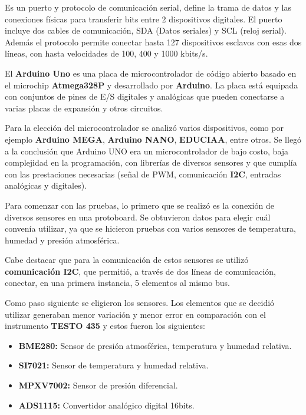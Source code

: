 \begin{tcolorbox}[colback=blue!5!white,colframe=blue!75!black,title=I2C]
	Es un puerto y protocolo de comunicación serial, define la trama de datos y las conexiones físicas para transferir bits entre 2 dispositivos digitales. El puerto incluye dos cables de comunicación, SDA (Datos seriales) y SCL (reloj serial). Además el protocolo permite conectar hasta 127 dispositivos esclavos con esas dos líneas, con hasta velocidades de 100, 400 y 1000 kbits/s. \end{tcolorbox}

\begin{tcolorbox}[colback=blue!5!white,colframe=blue!75!black,title=Arduino] El\textbf{ Arduino Uno} es una placa de microcontrolador de código abierto basado en el microchip \textbf{Atmega328P} y desarrollado por \textbf{Arduino}. La placa está equipada con conjuntos de pines de E/S digitales y analógicas que pueden conectarse a varias placas de expansión y otros circuitos.
   \end{tcolorbox}

	

Para la elección del microcontrolador se analizó varios dispositivos, como por ejemplo \textbf{Arduino MEGA}, \textbf{Arduino NANO}, \textbf{EDUCIAA}, entre otros. Se llegó a la conclusión que Arduino UNO era un microcontrolador de bajo costo, baja complejidad en la programación, con librerías de diversos sensores y que cumplía con las prestaciones necesarias (señal de PWM, comunicación \textbf{I2C}, entradas analógicas y digitales).


Para comenzar con las pruebas, lo primero que se realizó es la conexión de diversos sensores en una protoboard. Se obtuvieron datos para elegir cuál  convenía utilizar, ya que se hicieron pruebas con varios sensores de temperatura, humedad y presión atmosférica.


Cabe destacar que para la comunicación de estos sensores se utilizó \textbf{comunicación I2C}, que permitió, a través de dos líneas de comunicación, conectar, en una primera instancia,  5 elementos al mismo bus.


Como paso siguiente se eligieron los sensores. Los elementos que se decidió utilizar generaban menor variación y menor error en comparación con el instrumento \textbf{TESTO 435} y estos fueron los siguientes:

\begin{itemize}
	\item  \textbf{BME280:} Sensor de presión atmosférica, temperatura y humedad relativa.
	\item \textbf{SI7021:} Sensor de temperatura y humedad relativa.
	\item \textbf{MPXV7002:} Sensor de presión diferencial.
	\item \textbf{ADS1115:} Convertidor analógico digital 16bits.
\end{itemize}

